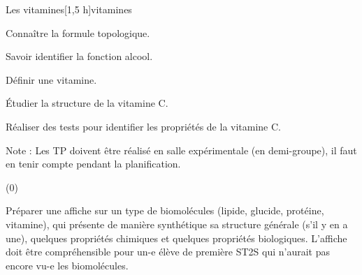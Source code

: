\begin{multicols}{2}
  \begin{TP}{Les vitamines}[1,5 h]{vitamines}
    \begin{prerequis}
      \item Connaître la formule topologique.
      \item Savoir identifier la fonction alcool.
    \end{prerequis}
    \begin{objectifs}
      \item Définir une vitamine.
      \item Étudier la structure de la vitamine C.
      \item Réaliser des tests pour identifier les propriétés de la vitamine C.
    \end{objectifs}
  \end{TP}
\end{multicols}


Note :
Les TP doivent être réalisé en salle expérimentale (en demi-groupe), il faut en tenir compte pendant la planification.


\newpage
\nomPrenomClasse
{}
\vspace*{12pt}

\vspace*{-353 pt}

\begin{programmeSeance}
\end{programmeSeance}

\begin{programmeSeance}[2]
\end{programmeSeance}

\begin{programmeSeance}[2](0)
\end{programmeSeance}


\begin{tacheFinale}
  Préparer une affiche  sur un type de biomolécules (lipide, glucide, protéine, vitamine), qui présente de manière synthétique sa structure générale  (s'il y en a une), quelques propriétés chimiques et quelques propriétés biologiques.
  L'affiche doit être compréhensible pour un-e élève de première \textsc{ST2S} qui n'aurait pas encore vu-e les biomolécules.
\end{tacheFinale}


